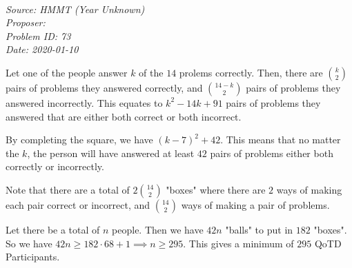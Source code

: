 \SSbreak\\
\emph{Source: HMMT (Year Unknown)}\\
\emph{Proposer: \Ppi}\\
\emph{Problem ID: 73}\\
\emph{Date: 2020-01-10}\\
\SSbreak

\bigskip

\begin{solution}\hfil\medskip
 
  Let one of the people answer $k$ of the $14$ prolems correctly. Then, there are $\binom{k}{2}$ pairs of problems they answered correctly, and $\binom{14-k}{2}$ pairs of problems they answered incorrectly. This equates to $k^2-14k+91$ pairs of problems they answered that are either both correct or both incorrect. 

  By completing the square, we have $(k-7)^2 +42$. This means that no matter the $k$, the person will have answered at least $42$ pairs of problems either both correctly or incorrectly. 
  
  Note that there are a total of $2\binom{14}{2}$ "boxes" where there are $2$ ways of making each pair correct or incorrect, and $\binom{14}{2}$ ways of making a pair of problems. 
  
  Let there be a total of $n$ people. Then we have $42n$ "balls" to put in $182$ "boxes". So we have $42n \ge 182\cdot 68+1 \implies n\ge 295$. This gives a minimum of $\boxed{295}$ QoTD Participants. 

\end{solution}\bigskip
